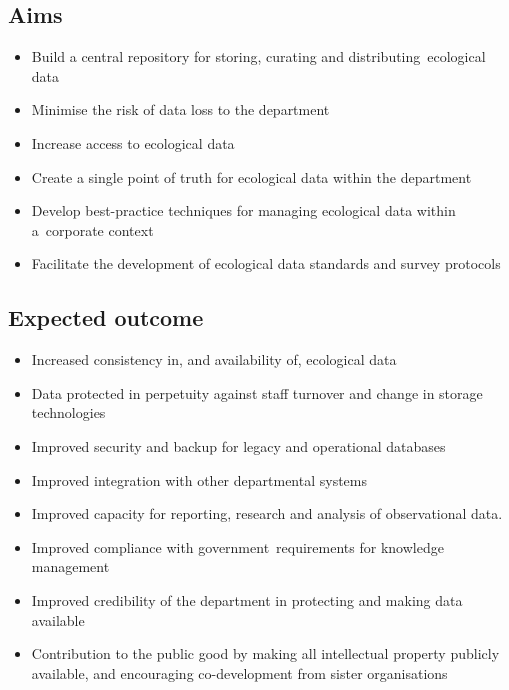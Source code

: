 \documentclass[version=last,
    paper=a4,                               %
    10pt,                                   %
    dvipsnames,
    oneside,                              %
    headings=openany,                       %
    open=any,
    BCOR=7mm,                               %
    DIV=15,     %
]{scrbook}
\begin{document}
\subsection*{Aims}

\begin{itemize}
\itemsep1pt\parskip0pt
\item
  Build a central repository for storing, curating and
  distributing~ecological data
\item
  Minimise the risk of data loss to the department
\item
  Increase access to ecological data
\item
  Create a single point of truth for ecological data within the
  department
\item
  Develop best-practice techniques for managing ecological data within
  a~corporate context
\item
  Facilitate the development of ecological data standards and survey
  protocols
\end{itemize}




\subsection*{Expected outcome}

\begin{itemize}
\itemsep1pt\parskip0pt
\item
  Increased consistency in, and availability of, ecological data
\item
  Data protected in perpetuity against staff turnover and change in
  storage technologies
\item
  Improved security and backup for legacy and operational databases
\item
  Improved integration with other departmental systems
\item
  Improved capacity for reporting, research and analysis of
  observational data.
\item
  Improved compliance with government~requirements for knowledge
  management
\item
  Improved credibility of the department in protecting and making data
  available
\item
  Contribution to the public good by making all intellectual property
  publicly available, and encouraging co-development from sister
  organisations
\end{itemize}
\end{document}
